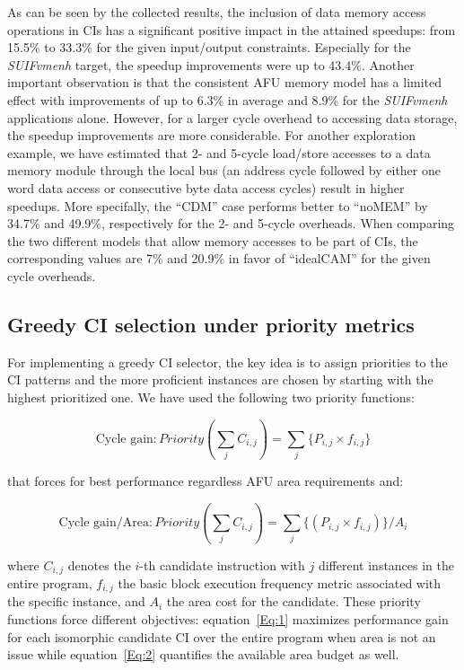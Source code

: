\documentclass{comjnl}
\begin{document}
As can be seen by the collected results, the inclusion of data memory access operations in CIs has a significant positive impact in the attained speedups: from 15.5\% to 33.3\% for the given input/output constraints. Especially for the {\it SUIFvmenh} target, the speedup improvements were up to 43.4\%. Another important observation is that the consistent AFU memory model has a limited effect with improvements of up to 6.3\% in average and 8.9\% for the {\it SUIFvmenh} applications alone. However, for a larger cycle overhead to accessing data storage, the speedup improvements are more considerable. For another exploration example, we have estimated that 2- and 5-cycle load/store accesses to a data memory module through the local bus (an address cycle followed by either one word data access or consecutive byte data access cycles) result in higher speedups. More specifally, the ``CDM'' case performs better to ``noMEM'' by 34.7\% and 49.9\%, respectively for the 2- and 5-cycle overheads. When comparing the two different models that allow memory accesses to be part of CIs, the corresponding values are 7\% and 20.9\% in favor of ``idealCAM'' for the given cycle overheads. 

\subsection{Greedy CI selection under priority metrics}
\label{Sec:GreedySelection}
For implementing a greedy CI selector, the key idea is to assign priorities to the CI patterns and the more proficient instances are chosen by starting with the highest prioritized one. We have used the following two priority functions: 

\begin{equation}
\label{Eq:1}
\text{Cycle gain}: Priority(\sum_{j} C_{i,j}) = \sum_{j} \{P_{i,j} \times f_{i,j}\}
\end{equation}

that forces for best performance regardless AFU area requirements and: 

\begin{equation}
\label{Eq:2}
\text{Cycle gain/Area}: Priority(\sum_{j} C_{i,j}) = \sum_{j} \{(P_{i,j} \times f_{i,j})\}/A_{i}
\end{equation}

where $C_{i,j}$ denotes the $i$-th candidate instruction with $j$ different instances in the entire program, $f_{i,j}$ the basic block execution frequency metric associated with the specific instance, and $A_{i}$ the area cost for the candidate. These priority functions force different objectives: equation~\ref{Eq:1} maximizes performance gain for each isomorphic candidate CI over the entire program when area is not an issue while equation~\ref{Eq:2} quantifies the available area budget as well.
\end{document}
